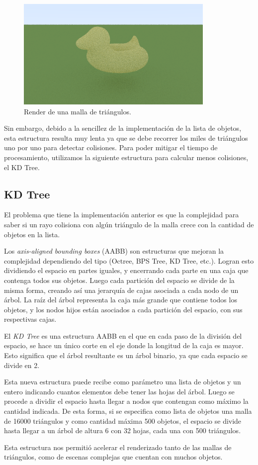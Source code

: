 \begin{figure}[H]
    \centering
    \includegraphics[width=.9\textwidth]{imgs/escena_malla_pato}
    \caption{Render de una malla de triángulos.}
    \label{fig:escena_malla_pato}
\end{figure}

Sin embargo, debido a la sencillez de la implementación de la lista de objetos, esta estructura
resulta muy lenta ya que se debe recorrer los miles de triángulos uno por uno para detectar
colisiones.
Para poder mitigar el tiempo de procesamiento, utilizamos la siguiente estructura para calcular
menos colisiones, el KD Tree.

\subsection{KD Tree} \label{subsec:kd_tree}

El problema que tiene la implementación anterior es que la complejidad para saber si un rayo
colisiona con algún triángulo de la malla crece con la cantidad de objetos en la lista.

Los \textit{axis-aligned bounding boxes} (AABB) son estructuras que mejoran la complejidad
dependiendo del tipo (Octree, BPS Tree, KD Tree, etc.).
Logran esto dividiendo el espacio en partes iguales, y encerrando cada parte en una caja que
contenga todos sus objetos.
Luego cada partición del espacio se divide de la misma forma, creando así una jerarquía de cajas
asociada a cada nodo de un árbol.
La raíz del árbol representa la caja más grande que contiene todos los objetos, y los nodos hijos
están asociados a cada partición del espacio, con sus respectivas cajas.

El \textit{KD Tree} es una estructura AABB en el que en cada paso de la división del espacio, se
hace un único corte en el eje donde la longitud de la caja es mayor.
Esto significa que el árbol resultante es un árbol binario, ya que cada espacio se divide en 2.

Esta nueva estructura puede recibe como parámetro una lista de objetos y un entero indicando
cuantos elementos debe tener las hojas del árbol.
Luego se procede a dividir el espacio hasta llegar a nodos que contengan como máximo la cantidad
indicada.
De esta forma, si se especifica como lista de objetos una malla de 16000 triángulos y como cantidad
máxima 500 objetos, el espacio se divide hasta llegar a un árbol de altura 6 con 32 hojas, cada una
con 500 triángulos.

Esta estructura nos permitió acelerar el renderizado tanto de las mallas de triángulos, como de
escenas complejas que cuentan con muchos objetos.
